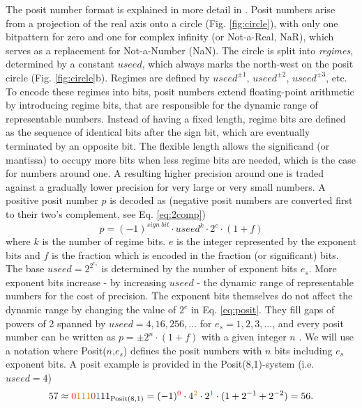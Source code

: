 \documentclass[draft]{agujournal2019}
\newcommand{\op}{\operatorname}
\begin{document}
The posit number format is explained in more detail in . Posit numbers arise from a projection of the real axis onto a circle (Fig. \ref{fig:circle}), with only one bitpattern for zero and one for complex infinity (or Not-a-Real, NaR), which serves as a replacement for Not-a-Number (NaN). The circle is split into \emph{regimes}, determined by a constant $useed$, which always marks the north-west on the posit circle (Fig. \ref{fig:circle}b). Regimes are defined by $useed^{\pm1}$, $useed^{\pm2}$, $useed^{\pm3}$, etc. To encode these regimes into bits, posit numbers extend floating-point arithmetic by introducing regime bits, that are responsible for the dynamic range of representable numbers. Instead of having a fixed length, regime bits are defined as the sequence of identical bits after the sign bit, which are eventually terminated by an opposite bit. The flexible length allows the significand (or mantissa) to occupy more bits when less regime bits are needed, which is the case for numbers around one. A resulting higher precision around one is traded against a gradually lower precision for very large or very small numbers. A positive posit number $p$ is decoded as \cite{Gustafson2017,Gustafson2017a} (negative posit numbers are converted first to their two's complement, see Eq. \ref{eq:2comp})
\begin{equation}
p = (-1)^{sign~bit} \cdot useed^k \cdot 2^e \cdot (1+f)
\label{eq:posit}
\end{equation}
where $k$ is the number of regime bits. $e$ is the integer represented by the exponent bits and $f$ is the fraction which is encoded in the fraction (or significant) bits. The base $useed = 2^{2^{e_s}}$ is determined by the number of exponent bits $e_s$. More exponent bits increase - by increasing $useed$ - the dynamic range of representable numbers for the cost of precision. The exponent bits themselves do not affect the dynamic range by changing the value of $2^e$ in Eq. \ref{eq:posit}. They fill gaps of powers of 2 spanned by $useed = 4,16,256,...$ for $e_s=1,2,3,...$, and every posit number can be written as $p = \pm 2^n \cdot (1+f)$ with a given integer $n$ \cite{Gustafson2017,Chen2018}. We will use a notation where Posit($n$,$e_s$) defines the posit numbers with $n$ bits including $e_s$ exponent bits. A posit example is provided in the Posit(8,1)-system (i.e. $useed = 4$)
\begin{equation}
57 \approx {\color{psign}0}{\color{pregime}111}{\color{pregimet}0}{\color{pexpo}1}11_{\op{Posit}(8,1)} = (-1)^{\color{psign}0} \cdot 4^{\color{pregime}2} \cdot 2^{\color{pexpo}1} \cdot (1+2^{-1}+2^{-2}) = 56.
\label{eq:posit_pos}
\end{equation}
\end{document}
